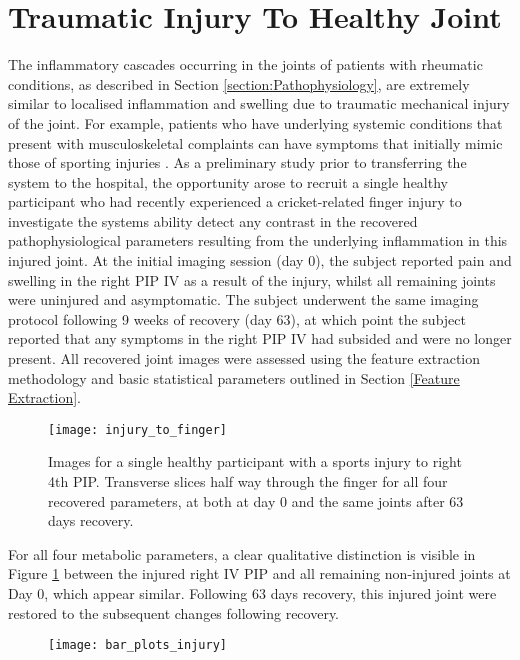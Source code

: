 \documentclass[twoside]{bhamthesis}
\theoremstyle{definition}
\begin{document}
\section{Traumatic Injury To Healthy Joint}

The inflammatory cascades occurring in the joints of patients with rheumatic conditions, as described in Section 
\ref{section:Pathophysiology}, are extremely similar to localised inflammation and swelling due to traumatic mechanical injury of the joint. For example, patients who have underlying systemic conditions that present with musculoskeletal complaints can have symptoms that initially mimic those of sporting injuries \cite{jennings2008rheumatic}. As a preliminary study prior to transferring the system to the hospital, the opportunity arose to recruit a single healthy participant who had recently experienced a cricket-related finger injury to investigate the systems ability detect any contrast in the recovered pathophysiological parameters resulting from the underlying inflammation in this injured joint. At the initial imaging session (day 0), the subject reported pain and swelling in the right PIP IV as a result of the injury, whilst all remaining joints were uninjured and asymptomatic. The subject underwent the same imaging protocol following 9 weeks of recovery (day 63), at which point the subject reported that any symptoms in the right PIP IV had subsided and were no longer present. All recovered joint images were assessed using the feature extraction methodology and basic statistical parameters outlined in Section \ref{Feature Extraction}.

\begin{figure}[!ht]
\centering\texttt{[image: injury\_to\_finger]}
\caption{Images for a single healthy participant with a sports injury to right 4th PIP. Transverse slices half way through the finger for all four recovered parameters, at both at day 0 and the same joints after 63 days recovery.}
\label{fig:injury_to_finger}
\end{figure}

For all four metabolic parameters, a clear qualitative distinction is visible in Figure \ref{fig:injury_to_finger} between the injured right IV PIP and all remaining non-injured joints at Day 0, which appear similar. Following 63 days recovery, this injured joint were restored to the subsequent changes following recovery.
 
\begin{figure}[!ht]
\centering\texttt{[image: bar\_plots\_injury]}
\caption{}
\label{fig:bar_plots_injury}
\end{figure}
\end{document}
